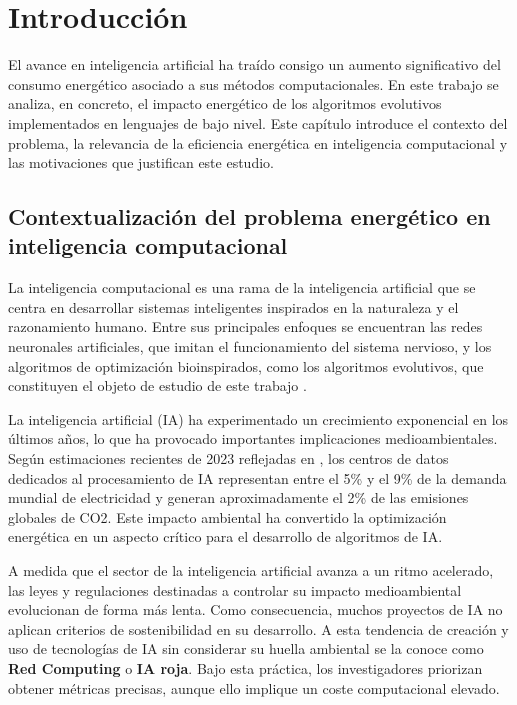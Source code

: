 \chapter{Introducción}

El avance en inteligencia artificial ha traído consigo un aumento significativo del consumo energético asociado a sus métodos computacionales. En este trabajo se analiza, en concreto, el impacto energético de los algoritmos evolutivos implementados en lenguajes de bajo nivel. Este capítulo introduce el contexto del problema, la relevancia de la eficiencia energética en inteligencia computacional y las motivaciones que justifican este estudio.

\section{Contextualización del problema energético en inteligencia computacional}

La inteligencia computacional es una rama de la inteligencia artificial que se centra en desarrollar sistemas inteligentes inspirados en la naturaleza y el razonamiento humano. Entre sus principales enfoques se encuentran las redes neuronales artificiales, que imitan el funcionamiento del sistema nervioso, y los algoritmos de optimización bioinspirados, como los algoritmos evolutivos, que constituyen el objeto de estudio de este trabajo \cite{dasci_ic}. 

La inteligencia artificial (IA) ha experimentado un crecimiento exponencial en los últimos años, lo que ha provocado importantes implicaciones medioambientales. Según estimaciones recientes de 2023 reflejadas en \cite{cotta2024consumo}, los centros de datos dedicados al procesamiento de IA representan entre el 5\% y el 9\% de la demanda mundial de electricidad y generan aproximadamente el 2\% de las emisiones globales de CO2. Este impacto ambiental ha convertido la optimización energética en un aspecto crítico para el desarrollo de algoritmos de IA.

A medida que el sector de la inteligencia artificial avanza a un ritmo acelerado, las leyes y regulaciones destinadas a controlar su impacto medioambiental evolucionan de forma más lenta. Como consecuencia, muchos proyectos de IA no aplican criterios de sostenibilidad en su desarrollo. A esta tendencia de creación y uso de tecnologías de IA sin considerar su huella ambiental se la conoce como \textbf{Red Computing} o \textbf{IA roja}. Bajo esta práctica, los investigadores priorizan obtener métricas precisas, aunque ello implique un coste computacional elevado.

